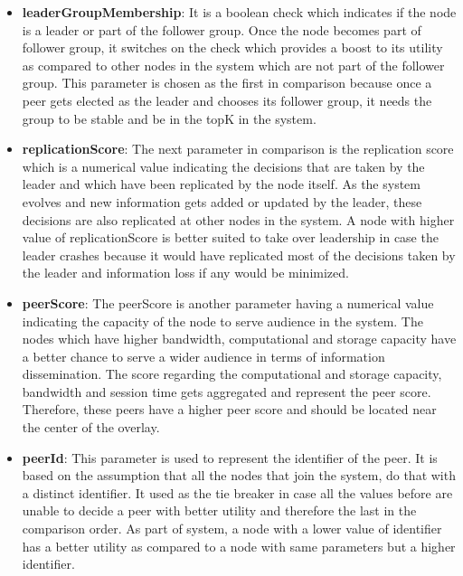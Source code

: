 \documentclass[a4paper,11pt]{kth-mag}
\begin{document}
\begin{itemize}


\item \textbf{leaderGroupMembership}: It is a boolean check which indicates if the node is a leader or part of the follower group. Once the node becomes part of follower group, it switches on the check which provides a boost to its utility as compared to other nodes in the system which are not part of the follower group. This parameter is chosen as the first in comparison because once a peer gets elected as the leader and chooses its follower group, it needs the group to be stable and be in the topK in the system.


\item \textbf{replicationScore}: The next parameter in comparison is the replication score which is a numerical value indicating the decisions that are taken by the leader and which have been replicated by the node itself. As the system evolves and new information gets added or updated by the leader, these decisions are also replicated at other nodes in the system. A node with higher value of replicationScore is better suited to take  over leadership in case the leader crashes because it would have replicated most of the decisions taken by the leader and information loss if any would be minimized.

\item \textbf{peerScore}: The peerScore is another parameter having a numerical value indicating the capacity of the node to serve audience in the system. The nodes which have higher bandwidth, computational and storage capacity have a better chance to serve a wider audience in terms of information dissemination. The score regarding the computational and storage capacity, bandwidth and session time gets aggregated and represent the peer score. Therefore, these peers have a higher peer score and should be located near the center of the overlay.


\item \textbf{peerId}: This parameter is used to represent the identifier of the peer.  It is based on the assumption that all the nodes that join the system, do that with a distinct identifier. It used as the tie breaker in case all the values before are unable to decide a peer with better utility and therefore the last in the comparison order. As part of system, a node with a lower value of identifier has a better utility as compared to a node with same parameters but a higher identifier.

\end{itemize}
\end{document}
